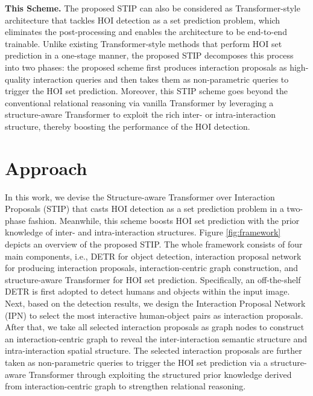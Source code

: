 \documentclass[10pt,twocolumn,letterpaper]{article}
\begin{document}
\textbf{This Scheme.} The proposed STIP can also be considered as Transformer-style architecture that tackles HOI detection as a set prediction problem, which eliminates the post-processing and enables the architecture to be end-to-end trainable. Unlike existing Transformer-style methods \cite{chen2021reformulating,kim2021hotr,tamura2021qpic,zou2021end} that perform HOI set prediction in a one-stage manner, the proposed STIP decomposes this process into two phases: the proposed scheme first produces interaction proposals as high-quality interaction queries and then takes them as non-parametric queries to trigger the HOI set prediction. Moreover, this STIP  scheme goes beyond the conventional relational reasoning via vanilla Transformer by leveraging a structure-aware Transformer to exploit the rich inter- or intra-interaction structure, thereby boosting the performance of the HOI detection.



\section{Approach}
In this work, we devise the Structure-aware Transformer over Interaction Proposals (STIP) that casts HOI detection as a set prediction problem in a two-phase fashion. Meanwhile, this scheme boosts HOI set prediction with the prior knowledge of inter- and intra-interaction structures. Figure \ref{fig:framework} depicts an overview of the proposed STIP. The whole framework consists of four main components, i.e., DETR for object detection, interaction proposal network for producing interaction proposals, interaction-centric graph construction, and structure-aware Transformer for HOI set prediction.
Specifically, an off-the-shelf DETR \cite{carion2020end} is first adopted to detect humans and objects within the input image. Next, based on the detection results, we design the Interaction Proposal Network (IPN) to select the most interactive human-object pairs as interaction proposals. After that, we take all selected interaction proposals as graph nodes to construct an interaction-centric graph to reveal the inter-interaction semantic structure and intra-interaction spatial structure. The selected interaction proposals are further taken as non-parametric queries to trigger the HOI set prediction via a structure-aware Transformer through exploiting the structured prior knowledge derived from interaction-centric graph to strengthen relational reasoning.
\end{document}
